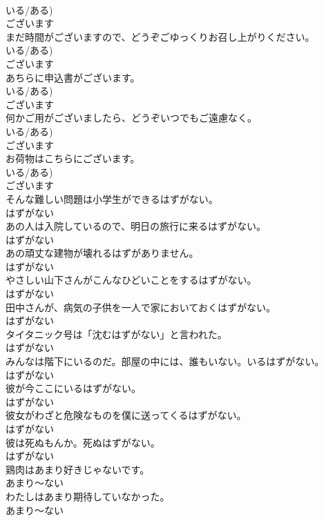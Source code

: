 \documentclass[8pt]{extreport}
\begin{document}
\begin{CJK}{UTF8}{min}
\\	いる/ある)	
\\	ございます
\\	まだ時間がございますので、どうぞごゆっくりお召し上がりください。	
\\	いる/ある)	
\\	ございます
\\	あちらに申込書がございます。	
\\	いる/ある)	
\\	ございます
\\	何かご用がございましたら、どうぞいつでもご遠慮なく。	
\\	いる/ある)	
\\	ございます
\\	お荷物はこちらにございます。	
\\	いる/ある)	
\\	ございます
\\	そんな難しい問題は小学生ができるはずがない。	
\\	はずがない
\\	あの人は入院しているので、明日の旅行に来るはずがない。	
\\	はずがない
\\	あの頑丈な建物が壊れるはずがありません。	
\\	はずがない
\\	やさしい山下さんがこんなひどいことをするはずがない。	
\\	はずがない
\\	田中さんが、病気の子供を一人で家においておくはずがない。	
\\	はずがない
\\	タイタニック号は「沈むはずがない」と言われた。	
\\	はずがない
\\	みんなは階下にいるのだ。部屋の中には、誰もいない。いるはずがない。	
\\	はずがない
\\	彼が今ここにいるはずがない。	
\\	はずがない
\\	彼女がわざと危険なものを僕に送ってくるはずがない。	
\\	はずがない
\\	彼は死ぬもんか。死ぬはずがない。	
\\	はずがない
\\	鶏肉はあまり好きじゃないです。	
\\	あまり～ない
\\	わたしはあまり期待していなかった。	
\\	あまり～ない

\end{CJK}
\end{document}
